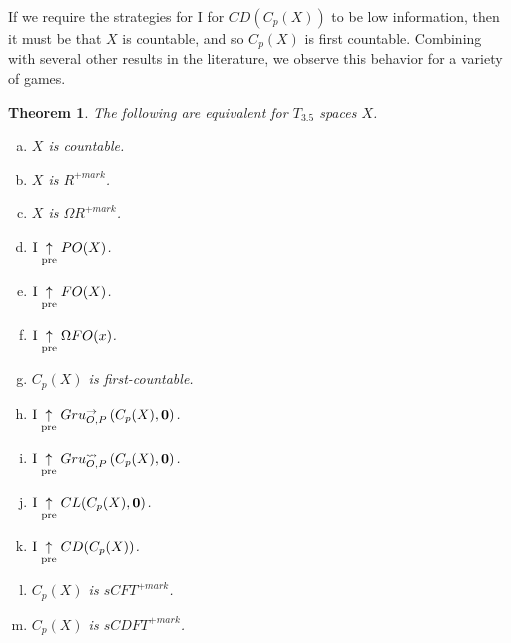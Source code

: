 \documentclass{amsart}
\theoremstyle{plain}
\newtheorem{theorem}{Theorem}
\theoremstyle{definition}
\theoremstyle{remark}
\theoremstyle{plain}
\theoremstyle{definition}
\theoremstyle{remark}
\begin{document}
If we require the strategies for I for \(CD(C_p(X))\) to be low information, then it must be that \(X\) is countable, and so \(C_p(X)\) is first countable.
Combining with several other results in the literature, we observe this behavior for a variety of games.

\begin{theorem}
The following are equivalent for \(T_{3.5}\) spaces \(X\).
 \begin{enumerate}[a)]
  \item \(X\) is countable.
  \item \(X\) is \(R^{+mark}\).
  \item \(X\) is \(\Omega R^{+mark}\).
  \item \(\mathrm{I}\underset{\text{pre}}{\uparrow} PO(X)\). 
  \item \(\mathrm{I}\underset{\text{pre}}{\uparrow} FO(X)\).
  \item \(\mathrm{I}\underset{\text{pre}}{\uparrow}\Omega FO(x)\).
  \item \(C_p(X)\) is first-countable.
  \item \(\mathrm{I}\underset{\text{pre}}{\uparrow} Gru_{O,P}^{\to}\left({C_p(X)},{\mathbf 0}\right)\).
  \item \(\mathrm{I}\underset{\text{pre}}{\uparrow} Gru_{O,P}^{\leadsto}\left({C_p(X)},{\mathbf 0}\right)\).
  \item \(\mathrm{I}\underset{\text{pre}}{\uparrow} CL(C_p(X),\mathbf 0)\).
  \item \(\mathrm{I}\underset{\text{pre}}{\uparrow} CD(C_p(X))\).
  \item \(C_p(X)\) is \(sCFT^{+mark}\).
  \item \(C_p(X)\) is \(sCDFT^{+mark}\).
 \end{enumerate}
\end{theorem}
\end{document}
